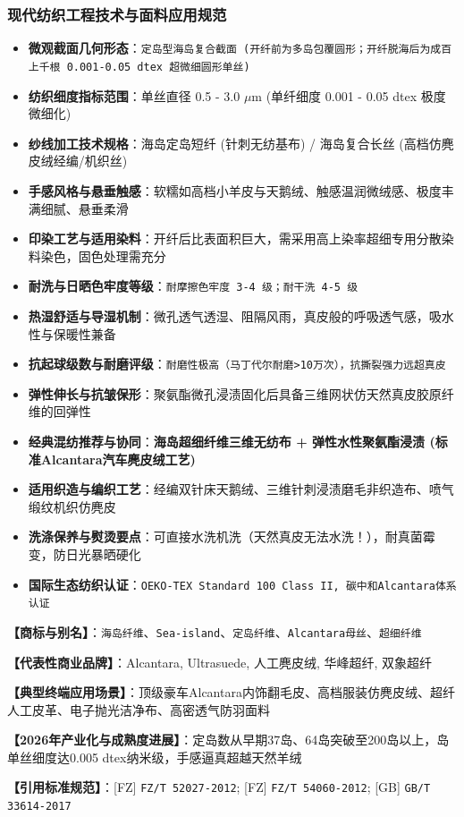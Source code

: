 \documentclass[11pt,openright,twoside,UTF8]{ctexbook}
\begin{document}
\subsubsection*{现代纺织工程技术与面料应用规范}
\begin{itemize} \setlength{\itemsep}{2pt}
    \item \textbf{微观截面几何形态}：\texttt{定岛型海岛复合截面 (开纤前为多岛包覆圆形；开纤脱海后为成百上千根 0.001-0.05 dtex 超微细圆形单丝)}
    \item \textbf{纺织细度指标范围}：单丝直径 0.5 - 3.0 $\mu$m (单纤细度 0.001 - 0.05 dtex 极度微细化)
    \item \textbf{纱线加工技术规格}：海岛定岛短纤 (针刺无纺基布) / 海岛复合长丝 (高档仿麂皮绒经编/机织丝)
    \item \textbf{手感风格与悬垂触感}：软糯如高档小羊皮与天鹅绒、触感温润微绒感、极度丰满细腻、悬垂柔滑
    \item \textbf{印染工艺与适用染料}：开纤后比表面积巨大，需采用高上染率超细专用分散染料染色，固色处理需充分
    \item \textbf{耐洗与日晒色牢度等级}：\texttt{耐摩擦色牢度 3-4 级；耐干洗 4-5 级}
    \item \textbf{热湿舒适与导湿机制}：微孔透气透湿、阻隔风雨，真皮般的呼吸透气感，吸水性与保暖性兼备
    \item \textbf{抗起球级数与耐磨评级}：\texttt{耐磨性极高（马丁代尔耐磨\textgreater{}10万次），抗撕裂强力远超真皮}
    \item \textbf{弹性伸长与抗皱保形}：聚氨酯微孔浸渍固化后具备三维网状仿天然真皮胶原纤维的回弹性
    \item \textbf{经典混纺推荐与协同}：\textbf{海岛超细纤维三维无纺布 + 弹性水性聚氨酯浸渍 (标准Alcantara汽车麂皮绒工艺)}
    \item \textbf{适用织造与编织工艺}：经编双针床天鹅绒、三维针刺浸渍磨毛非织造布、喷气缎纹机织仿麂皮
    \item \textbf{洗涤保养与熨烫要点}：可直接水洗机洗（天然真皮无法水洗！），耐真菌霉变，防日光暴晒硬化
    \item \textbf{国际生态纺织认证}：\texttt{OEKO-TEX Standard 100 Class II, 碳中和Alcantara体系认证}
\end{itemize}
\vspace{0.2cm}

\noindent\textbf{【商标与别名】}：\texttt{海岛纤维}、\texttt{Sea-island}、\texttt{定岛纤维}、\texttt{Alcantara母丝}、\texttt{超细纤维}\par
\noindent\textbf{【代表性商业品牌】}：Alcantara, Ultrasuede, 人工麂皮绒, 华峰超纤, 双象超纤\par
\noindent\textbf{【典型终端应用场景】}：顶级豪车Alcantara内饰翻毛皮、高档服装仿麂皮绒、超纤人工皮革、电子抛光洁净布、高密透气防羽面料\par
\noindent\textbf{【2026年产业化与成熟度进展】}：定岛数从早期37岛、64岛突破至200岛以上，岛单丝细度达0.005 dtex纳米级，手感逼真超越天然羊绒\par
\noindent\textbf{【引用标准规范】}：[FZ] \texttt{FZ/T 52027-2012}; [FZ] \texttt{FZ/T 54060-2012}; [GB] \texttt{GB/T 33614-2017}\par
\vspace{0.5cm}
\end{document}
